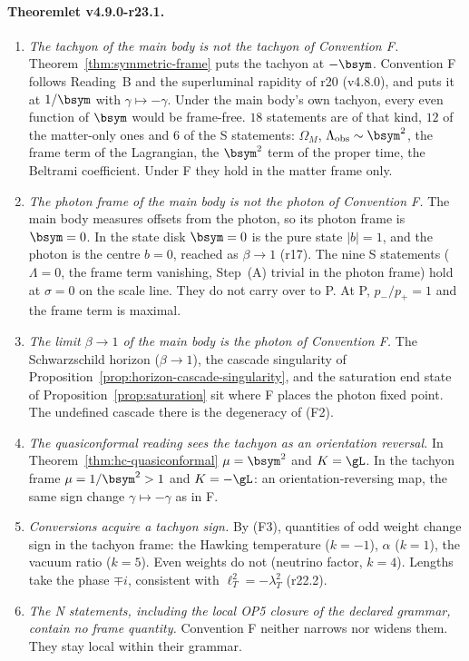 \paragraph{Theoremlet v4.9.0-r23.1.}
\begin{enumerate}[leftmargin=2em]
\item[(a)] \emph{The tachyon of the main body is not the tachyon of Convention F.}  Theorem~\ref{thm:symmetric-frame} puts the tachyon at
\(-\bsym\).  Convention F follows Reading~B and the superluminal rapidity of r20 (v4.8.0), and puts it at \(1/\bsym\) with
\(\gamma\mapsto-\gamma\).  Under the main body's own tachyon, every even function of \(\bsym\) would be frame-free.  \(18\) statements are of that
kind, \(12\) of the matter-only ones and \(6\) of the S statements: \(\Omega_M\), \(\Lambda_{\rm obs}\sim\bsym^2\), the frame term of the Lagrangian, the
\(\bsym^2\) term of the proper time, the Beltrami coefficient.  Under F they hold in the matter frame only.
\item[(b)] \emph{The photon frame of the main body is not the photon of Convention F.}  The main body measures offsets from the photon,
so its photon frame is \(\bsym=0\).  In the state disk \(\bsym=0\) is the pure state \(|b|=1\), and the photon is the centre \(b=0\),
reached as \(\beta\to1\) (r17).  The nine S statements (\(\Lambda=0\), the frame term vanishing, Step~(A) trivial in the photon
frame) hold at \(\sigma=0\) on the scale line.  They do not carry over to P.  At P, \(p_-/p_+=1\) and the frame term is maximal.
\item[(c)] \emph{The limit \(\beta\to1\) of the main body is the photon of Convention F.}  The Schwarzschild horizon (\(\beta\to1\)), the cascade
singularity of Proposition~\ref{prop:horizon-cascade-singularity}, and the saturation end state of Proposition~\ref{prop:saturation}
sit where F places the photon fixed point.  The undefined cascade there is the degeneracy of (F2).
\item[(d)] \emph{The quasiconformal reading sees the tachyon as an orientation reversal.}  In Theorem~\ref{thm:hc-quasiconformal}
\(\mu=\bsym^2\) and \(K=\gL\).  In the tachyon frame \(\mu=1/\bsym^2>1\) and \(K=-\gL\): an orientation-reversing map, the same sign
change \(\gamma\mapsto-\gamma\) as in F.
\item[(e)] \emph{Conversions acquire a tachyon sign.}  By (F3), quantities of odd weight change sign in the tachyon frame: the Hawking
temperature (\(k=-1\)), \(\alpha\) (\(k=1\)), the vacuum ratio (\(k=5\)).  Even weights do not (neutrino factor, \(k=4\)).  Lengths take
the phase \(\mp i\), consistent with \(\ell_T^2=-\lambda_T^2\) (r22.2).
\item[(f)] \emph{The N statements, including the local OP5 closure of the declared grammar, contain no frame quantity.}  Convention F neither
narrows nor widens them.  They stay local within their grammar.
\end{enumerate}

